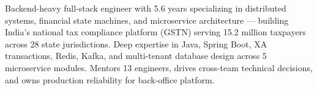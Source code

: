 
\begin{cvparagraph}
Backend-heavy full-stack engineer with 5.6 years specializing in distributed systems,
financial state machines, and microservice architecture — building India's national tax
compliance platform (GSTN) serving 15.2 million taxpayers across 28 state jurisdictions.
Deep expertise in Java, Spring Boot, XA transactions, Redis, Kafka, and multi-tenant
database design across 5 microservice modules. Mentors 13 engineers, drives cross-team
technical decisions, and owns production reliability for back-office platform.
\end{cvparagraph}
